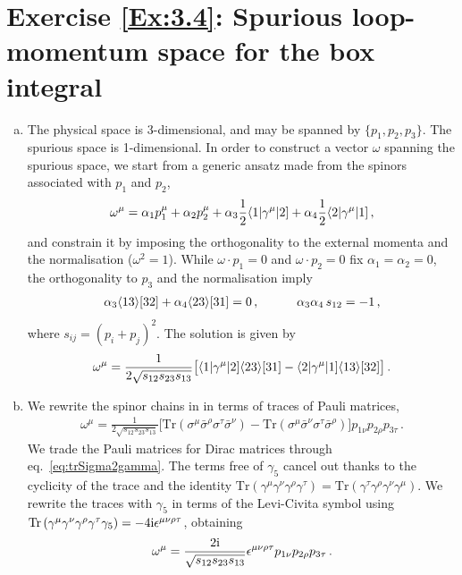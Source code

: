 \section*{Exercise \ref{Ex:3.4}: Spurious loop-momentum space for the box integral}
\label{Sol:3.4}
\begin{enumerate}[a)]
\item The physical space is 3-dimensional, and may be spanned by $\{p_1,p_2,p_3\}$. The spurious space is 1-dimensional. In order to construct a vector $\omega$ spanning the spurious space, we start from a generic ansatz made from the spinors associated with $p_1$ and $p_2$,
\begin{align}
\omega^{\mu} = \alpha_1 p_1^{\mu} + \alpha_2 p_2^{\mu} + \alpha_3 \frac{1}{2} \langle 1 | \gamma^{\mu} | 2 ] +  \alpha_4 \frac{1}{2} \langle 2 | \gamma^{\mu} | 1 ] \,,
\end{align}
and constrain it by imposing the orthogonality to the external momenta and the normalisation ($\omega^2 = 1$).
While $\omega \cdot p_1 = 0$ and $\omega \cdot p_2 = 0$ fix $\alpha_1 = \alpha_2 = 0$, the orthogonality to $p_3$ and the normalisation imply
\begin{align}
\alpha_3 \langle 1 3 \rangle [ 3 2 ] + \alpha_4 \langle 2 3 \rangle [ 3 1 ] = 0 \,, \qquad \quad \alpha_3 \alpha_4 \, s_{12} = -1 \,, 
\end{align} 
where $s_{ij} = (p_i + p_j)^2$. The solution is given by
\begin{align} \label{eq:omega4ptSpinors}
\omega^{\mu} = \frac{1}{2 \sqrt{s_{12} s_{23} s_{13}}} \bigl[ \langle 1 | \gamma^{\mu} | 2 ] \langle 2 3 \rangle [ 3 1 ] - 
   \langle 2 | \gamma^{\mu} | 1 ]  \langle 1 3 \rangle [ 3 2 ] \bigr] \,.
\end{align}


\item We rewrite the spinor chains in  in terms of traces of Pauli matrices,
\begin{align}
\omega^{\mu} = \frac{1}{2 \sqrt{s_{12} s_{23} s_{13}}} \bigl[ \text{Tr}\left( \sigma^{\mu} \bar{\sigma}^{\rho} \sigma^{\tau} \bar{\sigma}^{\nu} \right) -
    \text{Tr}\left( \sigma^{\mu} \bar{\sigma}^{\nu} \sigma^{\tau} \bar{\sigma}^{\rho} \right) \bigr] p_{1 \nu} p_{2 \rho} p_{3 \tau} \,.
\end{align}
We trade the Pauli matrices for Dirac matrices through eq.~\eqref{eq:trSigma2gamma}. The terms free of $\gamma_5$ cancel out thanks to the cyclicity of the trace and the identity $\text{Tr}\left( \gamma^{\mu} \gamma^{\nu} \gamma^{\rho} \gamma^{\tau} \right) = \text{Tr}\left( \gamma^{\tau} \gamma^{\rho} \gamma^{\nu} \gamma^{\mu} \right)$. We rewrite the traces with $\gamma_5$ in terms of the Levi-Civita symbol using $\text{Tr}\left(\gamma^{\mu} \gamma^{\nu} \gamma^{\rho} \gamma^{\tau} \gamma_5\right) = -4 \mathrm{i} \epsilon^{\mu\nu\rho\tau}$, obtaining
\begin{align}
\omega^{\mu} = \frac{2 \mathrm{i}}{ \sqrt{s_{12} s_{23} s_{13}}}  \epsilon^{\mu \nu \rho \tau} p_{1\nu} p_{2\rho} p_{3\tau} \,.
\end{align}

\end{enumerate}

